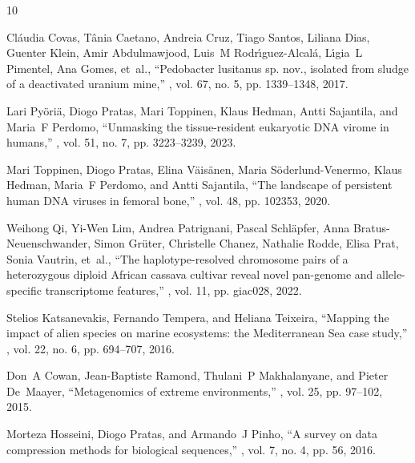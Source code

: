 \documentclass[smallabstract,smallcaptions]{dccpaper}
\begin{document}
\begin{thebibliography}{10}

Cl{\'a}udia Covas, T{\^a}nia Caetano, Andreia Cruz, Tiago Santos, Liliana Dias,
  Guenter Klein, Amir Abdulmawjood, Luis~M Rodr{\'\i}guez-Alcal{\'a},
  L{\'\i}gia~L Pimentel, Ana Gomes, et~al.,
\newblock ``{Pedobacter lusitanus sp. nov., isolated from sludge of a
  deactivated uranium mine},''
, vol. 67, no. 5, pp. 1339--1348, 2017.

Lari Py{\"o}ri{\"a}, Diogo Pratas, Mari Toppinen, Klaus Hedman, Antti
  Sajantila, and Maria~F Perdomo,
\newblock ``{Unmasking the tissue-resident eukaryotic DNA virome in humans},''
, vol. 51, no. 7, pp. 3223--3239, 2023.

Mari Toppinen, Diogo Pratas, Elina V{\"a}is{\"a}nen, Maria
  S{\"o}derlund-Venermo, Klaus Hedman, Maria~F Perdomo, and Antti Sajantila,
\newblock ``{The landscape of persistent human DNA viruses in femoral bone},''
, vol. 48, pp. 102353,
  2020.

Weihong Qi, Yi-Wen Lim, Andrea Patrignani, Pascal Schl{\"a}pfer, Anna
  Bratus-Neuenschwander, Simon Gr{\"u}ter, Christelle Chanez, Nathalie Rodde,
  Elisa Prat, Sonia Vautrin, et~al.,
\newblock ``{The haplotype-resolved chromosome pairs of a heterozygous diploid
  African cassava cultivar reveal novel pan-genome and allele-specific
  transcriptome features},''
, vol. 11, pp. giac028, 2022.

Stelios Katsanevakis, Fernando Tempera, and Heliana Teixeira,
\newblock ``{Mapping the impact of alien species on marine ecosystems: the
  Mediterranean Sea case study},''
, vol. 22, no. 6, pp. 694--707,
  2016.

Don~A Cowan, Jean-Baptiste Ramond, Thulani~P Makhalanyane, and Pieter
  De~Maayer,
\newblock ``{Metagenomics of extreme environments},''
, vol. 25, pp. 97--102, 2015.

Morteza Hosseini, Diogo Pratas, and Armando~J Pinho,
\newblock ``{A survey on data compression methods for biological sequences},''
, vol. 7, no. 4, pp. 56, 2016.


\end{thebibliography}
\end{document}
